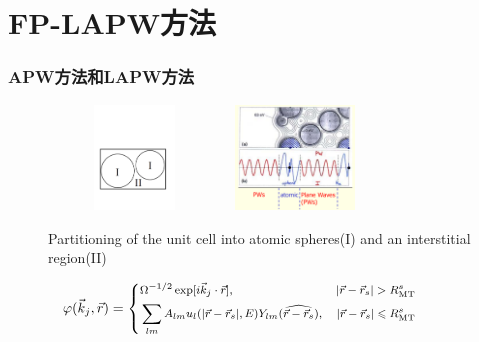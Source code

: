 \documentclass[cjk,slidestop,compress,mathserif,blue]{beamer}
\begin{document}
\section{FP-LAPW方法}
\frame
{
\frametitle{\textrm{APW}方法和\textrm{LAPW}方法}
\begin{figure}[h!]
\centering
\includegraphics[height=1.10in,width=1.80in,viewport=40 150 545 465,clip]{Figures/Muffin_tin.pdf}
\includegraphics[height=1.10in,width=1.45in,viewport=1 20 485 435,clip]{Figures/APW.png}
\caption{\small \textrm{Partitioning of the unit cell into atomic spheres(I) and an interstitial region(II)}}%
\label{Muffin_tin}
\end{figure}
\begin{displaymath}
\hskip -28pt\footnotesize \varphi(\vec k_j,\vec r)=\left\{
  \begin{aligned}
    &\Omega^{-1/2}\exp[i\vec k_j\cdot\vec r],&|\vec r-\vec r_s|>R_{\mathrm{MT}}^s\\
    &\sum_{lm}A_{lm}u_l(|\vec r-\vec r_s|,E)Y_{lm}(\widehat{\vec r-\vec r_s}),&|\vec r-\vec r_s|\leqslant R_{\mathrm{MT}}^s
  \end{aligned}
\right.
\end{displaymath}
}
\end{document}
